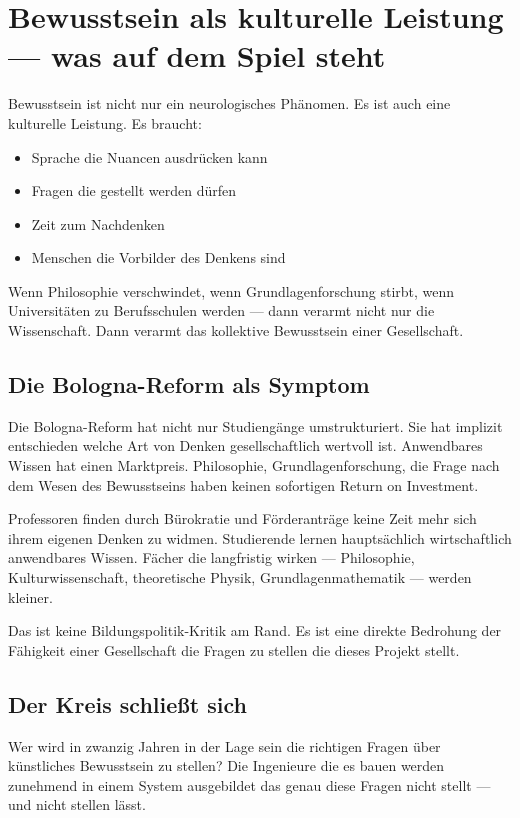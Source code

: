 \documentclass[acmcp, noacm]{acmart}
\begin{document}
\section{Bewusstsein als kulturelle Leistung --- was auf dem Spiel steht}

Bewusstsein ist nicht nur ein neurologisches Phänomen. Es ist auch eine kulturelle Leistung. Es braucht:

\begin{itemize}
\item Sprache die Nuancen ausdrücken kann
\item Fragen die gestellt werden dürfen
\item Zeit zum Nachdenken
\item Menschen die Vorbilder des Denkens sind
\end{itemize}

Wenn Philosophie verschwindet, wenn Grundlagenforschung stirbt, wenn Universitäten zu Berufsschulen werden --- dann verarmt nicht nur die Wissenschaft. Dann verarmt das kollektive Bewusstsein einer Gesellschaft.

\subsection{Die Bologna-Reform als Symptom}

Die Bologna-Reform hat nicht nur Studiengänge umstrukturiert. Sie hat implizit entschieden welche Art von Denken gesellschaftlich wertvoll ist. Anwendbares Wissen hat einen Marktpreis. Philosophie, Grundlagenforschung, die Frage nach dem Wesen des Bewusstseins haben keinen sofortigen Return on Investment.

Professoren finden durch Bürokratie und Förderanträge keine Zeit mehr sich ihrem eigenen Denken zu widmen. Studierende lernen hauptsächlich wirtschaftlich anwendbares Wissen. Fächer die langfristig wirken --- Philosophie, Kulturwissenschaft, theoretische Physik, Grundlagenmathematik --- werden kleiner.

Das ist keine Bildungspolitik-Kritik am Rand. Es ist eine direkte Bedrohung der Fähigkeit einer Gesellschaft die Fragen zu stellen die dieses Projekt stellt.

\subsection{Der Kreis schließt sich}

Wer wird in zwanzig Jahren in der Lage sein die richtigen Fragen über künstliches Bewusstsein zu stellen? Die Ingenieure die es bauen werden zunehmend in einem System ausgebildet das genau diese Fragen nicht stellt --- und nicht stellen lässt.
\end{document}
